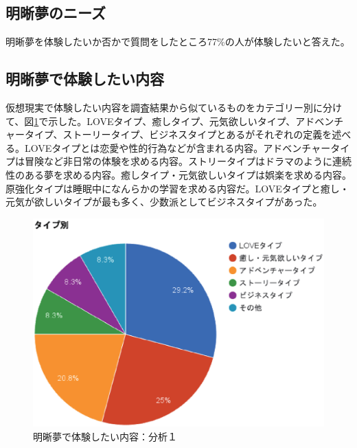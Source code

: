 \subsection{明晰夢のニーズ}
明晰夢を体験したいか否かで質問をしたところ77\%の人が体験したいと答えた。

\subsection{明晰夢で体験したい内容}
仮想現実で体験したい内容を調査結果から似ているものをカテゴリー別に分けて、図\ref{desiredDreamTpye}で示した。LOVEタイプ、癒しタイプ、元気欲しいタイプ、アドベンチャータイプ、ストーリータイプ、ビジネスタイプとあるがそれぞれの定義を述べる。LOVEタイプとは恋愛や性的行為などが含まれる内容。アドベンチャータイプは冒険など非日常の体験を求める内容。ストリータイプはドラマのように連続性のある夢を求める内容。癒しタイプ・元気欲しいタイプは娯楽を求める内容。原強化タイプは睡眠中になんらかの学習を求める内容だ。LOVEタイプと癒し・元気が欲しいタイプが最も多く、少数派としてビジネスタイプがあった。

\begin{figure}[htbp]
\begin{center}
\includegraphics[width=15cm]{eps/dreamType.eps}
\caption{明晰夢で体験したい内容：分析１}
\label{desiredDreamTpye}
\end{center}
\end{figure}

